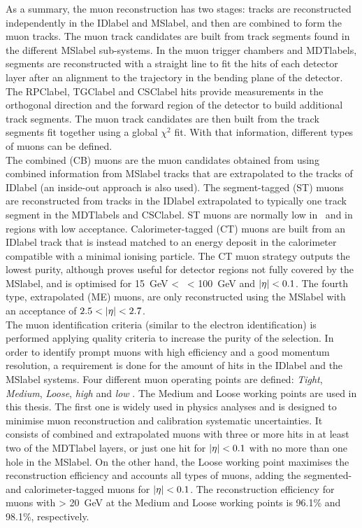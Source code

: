 As a summary, the muon reconstruction has two stages: tracks are reconstructed independently in the \acrshort{IDlabel} and \acrshort{MSlabel}, and then are combined to form the muon tracks. The muon track candidates are built from track segments found in the different \acrshort{MSlabel} sub-systems. In the muon trigger chambers and \acrshort{MDTlabel}s, segments are reconstructed with a straight line to fit the hits of each detector layer after an alignment to the trajectory in the bending plane of the detector. The \acrshort{RPClabel}, \acrshort{TGClabel} and \acrshort{CSClabel} hits provide measurements in the orthogonal direction and the forward region of the detector to build additional track segments. The muon track candidates are then built from the track segments fit together using a global $\chi^2$ fit. With that information, different types of muons can be defined.\\

The combined (CB) muons are the muon candidates obtained from using combined information from \acrshort{MSlabel} tracks that are extrapolated to the tracks of \acrshort{IDlabel} (an inside-out approach is also used). The segment-tagged (ST) muons are reconstructed from tracks in the \acrshort{IDlabel} extrapolated to typically one track segment in the \acrshort{MDTlabel}s and \acrshort{CSClabel}. ST muons are normally low in \pT\ and in regions with low acceptance. Calorimeter-tagged (CT) muons are built from an \acrshort{IDlabel} track that is instead matched to an energy deposit in the calorimeter compatible with a minimal ionising particle. The CT muon strategy outputs the lowest purity, although proves useful for detector regions not fully covered by the \acrshort{MSlabel}, and is optimised for 15~GeV < \pT\ < 100~GeV and $\abs{\eta}<0.1$. The fourth type, extrapolated (ME) muons, are only reconstructed using the \acrshort{MSlabel} with an acceptance of $2.5 < \abs{\eta} < 2.7$.\\

The muon identification criteria (similar to the electron identification) is performed applying quality criteria to increase the purity of the selection. In order to identify prompt muons with high efficiency and a
good momentum resolution, a requirement is done for the amount of hits in the \acrshort{IDlabel} and the \acrshort{MSlabel} systems. Four different muon operating points are defined: \textit{Tight}, \textit{Medium}, \textit{Loose}, \textit{high \pT} and \textit{low \pT}. The Medium and Loose working points are used in this thesis. The first one is widely used in physics analyses and is designed to minimise muon reconstruction and calibration systematic uncertainties. It consists of combined and extrapolated muons with three or more hits in at least two of the \acrshort{MDTlabel} layers, or just one hit for $\abs{\eta}<0.1$ with no more than one hole in the \acrshort{MSlabel}. On the other hand, the Loose working point maximises the reconstruction efficiency and accounts all types of muons, adding the segmented- and calorimeter-tagged muons for $\abs{\eta}<0.1$. The reconstruction efficiency for muons with \pT > 20~GeV at the Medium and Loose working points is 96.1\% and 98.1\%, respectively. \\

